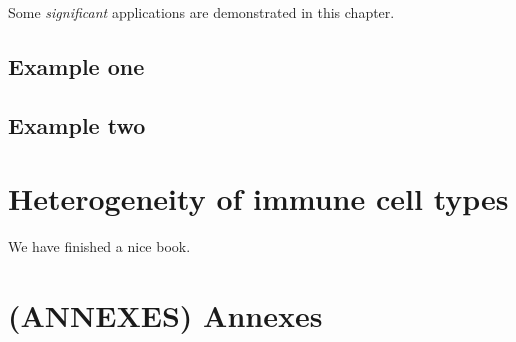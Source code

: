 \documentclass[12pt,]{book}
\theoremstyle{definition}
\theoremstyle{definition}
\theoremstyle{definition}
\theoremstyle{remark}
\begin{document}
Some \emph{significant} applications are demonstrated in this chapter.

\hypertarget{example-one}{%
\section{Example one}\label{example-one}}

\hypertarget{example-two}{%
\section{Example two}\label{example-two}}

\hypertarget{heterogeneity-of-immune-cell-types}{%
\chapter{Heterogeneity of immune cell
types}\label{heterogeneity-of-immune-cell-types}}

We have finished a nice book.

\hypertarget{annexes-annexes}{%
\chapter*{(ANNEXES) Annexes}\label{annexes-annexes}}


\end{document}
